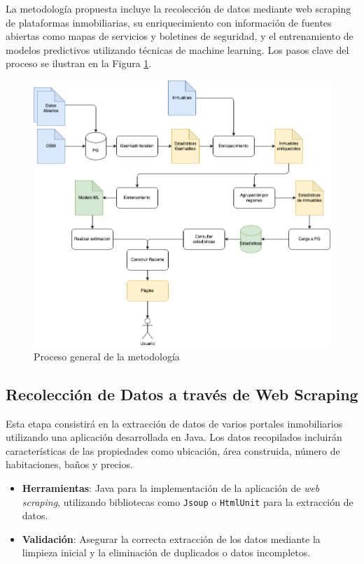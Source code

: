 La metodología propuesta incluye la recolección de datos mediante web scraping de plataformas inmobiliarias, su enriquecimiento con información de fuentes abiertas como mapas de servicios y boletines de seguridad, y el entrenamiento de modelos predictivos utilizando técnicas de machine learning. Los pasos clave del proceso se ilustran en la Figura \ref{fig:metodologia}.

\begin{figure}
    \centering
    \includegraphics[width=0.85\linewidth]{Images/metodologia.png}
    \caption{Proceso general de la metodología}
    \label{fig:metodologia}
\end{figure}

\subsection*{Recolección de Datos a través de Web Scraping}
Esta etapa consistirá en la extracción de datos de varios portales inmobiliarios utilizando una aplicación desarrollada en Java. Los datos recopilados incluirán características de las propiedades como ubicación, área construida, número de habitaciones, baños y precios.

\begin{itemize}
    \item \textbf{Herramientas}: Java para la implementación de la aplicación de \textit{web scraping}, utilizando bibliotecas como \texttt{Jsoup} o \texttt{HtmlUnit} para la extracción de datos.
    \item \textbf{Validación}: Asegurar la correcta extracción de los datos mediante la limpieza inicial y la eliminación de duplicados o datos incompletos.
\end{itemize}

